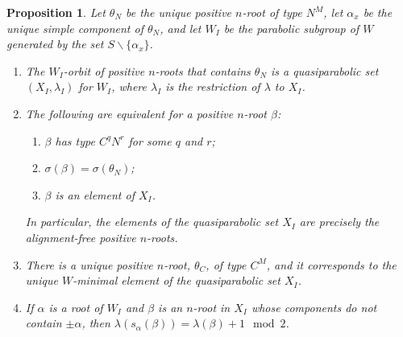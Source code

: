 \documentclass[11pt]{amsart}
\theoremstyle{plain}
\newtheorem{prop}[theorem]{Proposition}
\theoremstyle{definition}
\theoremstyle{remark}
\numberwithin{equation}{subsection}
\newcommand{\al}{\alpha}
\newcommand{\be}{\beta}
\begin{document}
\begin{prop}\label{prop:neststab}
Let $\theta_N$ be the unique positive $n$-root of type $N^M$, let $\al_x$ be the
unique simple component of $\theta_N$, and let $W_I$ be the parabolic subgroup
of $W$ generated by the set $S \backslash \{\al_x\}$.
\begin{enumerate}
    \item[{\rm (i)}]{The $W_I$-orbit of positive $n$-roots that contains
     $\theta_N$ is a quasiparabolic set $(X_I, \lambda_I)$ for $W_I$, where
 $\lambda_I$ is the restriction of $\lambda$ to $X_I$.}
\item[{\rm (ii)}]{The following are equivalent for a positive $n$-root $\be$:
        \begin{enumerate}
            \item[{\rm (1)}]{$\be$ has type $C^q N^r$ for some $q$ and $r$;}
            \item[{\rm (2)}]{$\sigma(\be) = \sigma(\theta_N)$;}
            \item[{\rm (3)}]{$\be$ is an element of $X_I$.}
    \end{enumerate}} \noindent In particular, the elements of the quasiparabolic set $X_I$
        are precisely the alignment-free positive $n$-roots.
    \item[{\rm (iii)}]{There is a unique positive $n$-root, $\theta_C$, of type
     $C^M$, and it corresponds to the unique $W$-minimal element of the
 quasiparabolic set $X_I$.}
\item[{\rm (iv)}]{If $\al$ is a root of $W_I$ and $\be$ is an $n$-root in $X_I$
     whose components do not contain $\pm\al$, then $\lambda(s_\al(\be)) =
 \lambda(\be) + 1 \mod 2$. }
\end{enumerate}
\end{prop}
\end{document}
